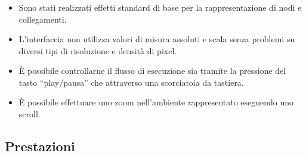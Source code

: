 \documentclass[%
]{beamer}
\begin{document}
    \begin{frame}
        \frametitle{\insertsection}
        \framesubtitle{\insertsubsection}
        \begin{itemize}[<+(1)->]
            \item
                Sono stati realizzati effetti standard di base per la rappresentazione di nodi e collegamenti.

            \item
                L'interfaccia non utilizza valori di misura assoluti e scala senza problemi su diversi tipi di risoluzione e densità di pixel.

            \item
                È possibile controllarne il flusso di esecuzione sia tramite la pressione del tasto ``play/pausa'' che attraverso una scorciatoia da tastiera.

            \item
                È possibile effettuare uno zoom nell'ambiente rappresentato eseguendo uno scroll.
        \end{itemize}
    \end{frame}

    \subsection{Prestazioni}\label{subsec:benchmark}
    \begin{frame}
        \frametitle{\insertsection}
        \framesubtitle{\insertsubsection}
        
    \end{frame}
\end{document}

